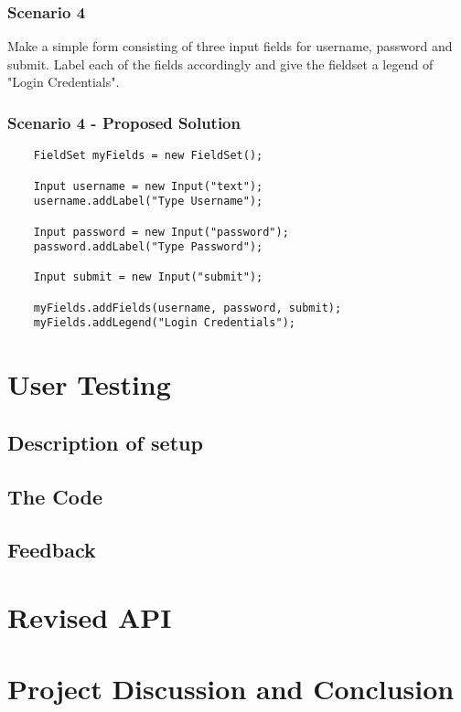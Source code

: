 \documentclass[12pt]{article}
\begin{document}
\subsubsection{Scenario 4}
Make a simple form consisting of three input fields for username, password and submit. Label each of the fields accordingly and give the fieldset a legend of "Login Credentials".

\subsubsection{Scenario 4 - Proposed Solution}

\begin{lstlisting}
    FieldSet myFields = new FieldSet();

    Input username = new Input("text");
    username.addLabel("Type Username");
    
    Input password = new Input("password");
    password.addLabel("Type Password");
    
    Input submit = new Input("submit");

    myFields.addFields(username, password, submit);
    myFields.addLegend("Login Credentials");
\end{lstlisting}

\section{User Testing}

\subsection{Description of setup}

\subsection{The Code}

\subsection{Feedback}

\section{Revised API}

\section{Project Discussion and Conclusion}
\end{document}
